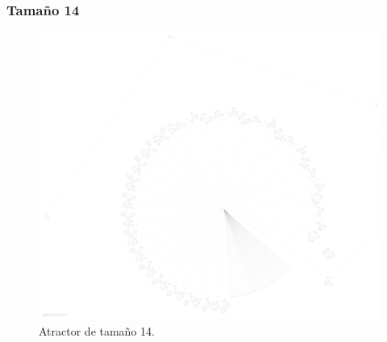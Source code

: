 \documentclass[11pt]{article}
\begin{document}
			\subsubsection{Tamaño 14}
			\begin{figure}[H]
			\centering
			\includegraphics[scale=0.1]{resources/Atractores22/atractor_22_size_14.png}
			\caption{Atractor de tamaño 14.}\label{fig:picture}
			\end{figure}
\end{document}
